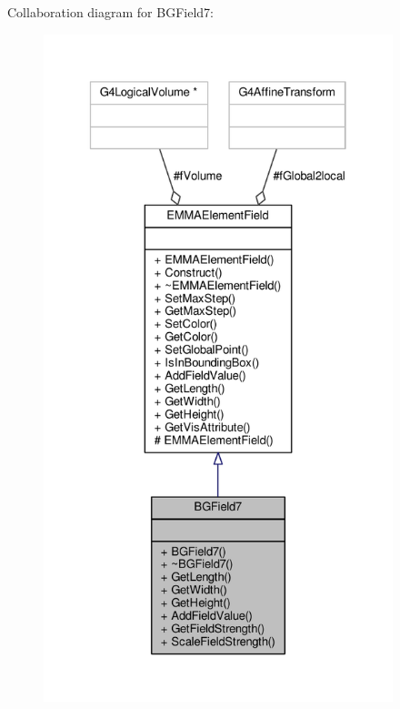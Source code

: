 Collaboration diagram for B\+G\+Field7\+:
\nopagebreak
\begin{figure}[H]
\begin{center}
\leavevmode
\includegraphics[height=550pt]{classBGField7__coll__graph}
\end{center}
\end{figure}
